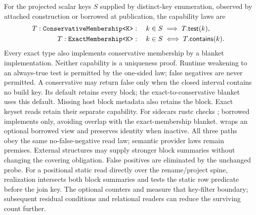 For the projected scalar keys $S$ supplied by distinct-key enumeration,
observed by attached construction or borrowed at publication, the capability laws are
\[
 \begin{aligned}
 T:\code{ConservativeMembership<K>} &: \quad k\in S\implies T.\mathsf{test}(k),\\
 T:\code{ExactMembership<K>} &: \quad k\in S\iff T.\mathsf{contains}(k).
 \end{aligned}
\]
Every exact type also implements conservative membership by a blanket
implementation. Neither capability is a uniqueness proof. Runtime weakening
to an always-true test is permitted by the one-sided law; false negatives are
never permitted. A conservative  may return false only
when the closed interval contains no build key. Its default retains every
block; the exact-to-conservative blanket uses this default. Missing host block
metadata also retains the block. Exact keyset reads retain their separate
 capability. For sidecars rustc checks
; borrowed  implements
 only, avoiding overlap with the exact-membership blanket.
 wraps an optional borrowed view and preserves identity
when inactive. All three paths obey the same no-false-negative read law;
semantic provider laws remain premises.
External structures may supply stronger block summaries without changing the
covering obligation. False positives are eliminated by the unchanged probe.
For a positional static read directly over the rename/project spine, realization
intersects both block summaries and tests the static row predicate before the
join key. The optional counters  and
 measure that key-filter boundary; subsequent residual
conditions and relational readers can reduce the surviving count further.
\begin{mathpar}
\end{mathpar}
